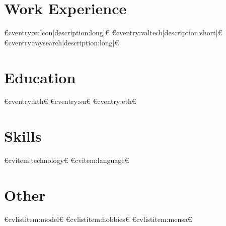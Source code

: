 \documentclass[10pt,a4paper,sans]{moderncv}
\begin{document}
\makecvtitle




\section{Work Experience}
€cventry:valcon[description:long]€
€cventry:valtech[description:short]€
€cventry:raysearch[description:long]€

\section{Education}
€cventry:kth€
€cventry:su€
€cventry:eth€

\section{Skills}
€cvitem:technology€
€cvitem:language€

\section{Other}
€cvlistitem:model€
€cvlistitem:hobbies€
€cvlistitem:mensa€


\newpage

\end{document}
